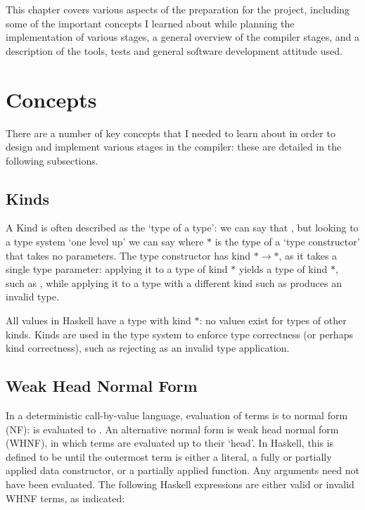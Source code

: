 \documentclass[dissertation.tex]{subfiles}
\begin{document}
This chapter covers various aspects of the preparation for the project, including some of the important concepts I
learned about while planning the implementation of various stages, a general overview of the compiler stages, and a
description of the tools, tests and general software development attitude used.

\section{Concepts}
{

    There are a number of key concepts that I needed to learn about in order to design and implement various stages in
    the compiler: these are detailed in the following subsections.

    \subsection{Kinds}\label{sec:kinds}
    {

        A Kind is often described as the `type of a type': we can say that , but looking to a type
        system `one level up' we can say  where \(*\) is the type of a `type constructor' that
        takes no parameters. The type constructor  has kind \(*\rightarrow*\), as it takes a single type
        parameter: applying it to a type of kind \(*\) yields a type of kind \(*\), such as , while
        applying it to a type with a different kind such as  produces an invalid type.
        
        All values in Haskell have a type with kind \(*\): no values exist for types of other kinds. Kinds are used in
        the type system to enforce type correctness (or perhaps kind correctness), such as rejecting 
        as an invalid type application.

    }
    \subsection{Weak Head Normal Form}\label{sec:whnf}
    {

        In a deterministic call-by-value language, evaluation of terms is to normal form (NF):  is evaluated to . An alternative normal form is weak head normal form (WHNF),
        in which terms are evaluated up to their `head'. In Haskell, this is defined to be until the outermost term is
        either a literal, a fully or partially applied data constructor, or a partially applied function. Any arguments
        need not have been evaluated. The following Haskell expressions are either valid or invalid WHNF terms, as
        indicated:

}}
\end{document}
